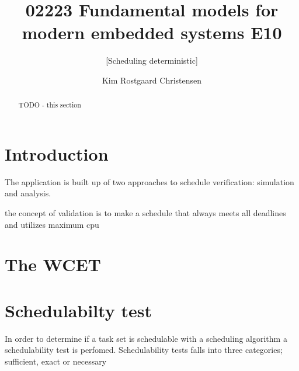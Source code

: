 \documentclass{acm_proc_article-sp}
\begin{document}
\title{02223 Fundamental models for modern embedded systems E10}
\subtitle{[Scheduling deterministic]
}

\author{
\alignauthor 
Kim Rostgaard Christensen\\
}

\maketitle

\begin{abstract}
TODO - this section

\end{abstract}




\section{Introduction}


The application is built up of two approaches to schedule verification: simulation and analysis.

the concept of validation is to make a schedule that always meets all deadlines and utilizes maximum cpu

\section{The WCET}




\section{Schedulabilty test}
In order to determine if a task set is schedulable with a scheduling algorithm a schedulability test is perfomed.
Schedulability tests falls into three categories; sufficient, exact or necessary
\end{document}
